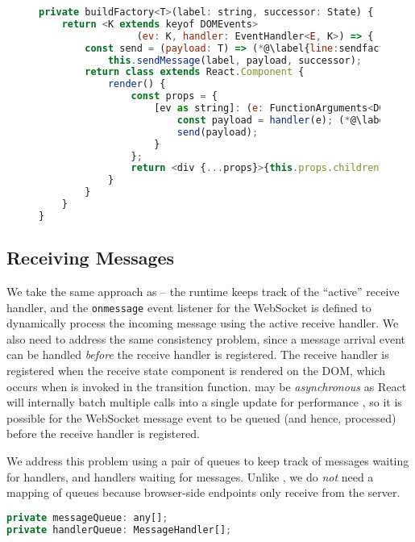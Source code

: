 \begin{figure}[!h]
\begin{lstlisting}[language=javascript,tabsize=2]
private buildFactory<T>(label: string, successor: State) { (*@\label{line:sendfactoryparams}@*)
	return <K extends keyof DOMEvents>
				 (ev: K, handler: EventHandler<E, K>) => {
		const send = (payload: T) => (*@\label{line:sendfactorycurrysend}@*)
			this.sendMessage(label, payload, successor);
		return class extends React.Component {
			render() {
				const props = {
					[ev as string]: (e: FunctionArguments<DOMEvents[K]>) => {
						const payload = handler(e); (*@\label{line:sendfactoryhandler}@*)
						send(payload);
					}
				};
				return <div {...props}>{this.props.children}</div> (*@\label{line:sendfactorydiv}@*)
			}		
		}	
	}
}
\end{lstlisting}
\label{lst:reactsendfactory}
\end{figure}

\subsection{Receiving Messages}
\label{subsection:reactruntimereceive}

We take the same approach as  --
the runtime keeps track of the ``active'' receive handler,
and the \texttt{onmessage} event listener for the WebSocket
is defined to dynamically process the incoming message
using the active receive handler.
We also need to address the same consistency problem, since
a message arrival event can be handled \textit{before}
the receive handler is registered.
The receive handler is registered when the receive state component
is rendered on the DOM, which occurs when 
is invoked in the transition function.
 may be \textit{asynchronous}
as React will internally batch multiple calls into a single update
for performance \cite{ReactState}, so it is possible for the WebSocket message
event to be queued (and hence, processed) before the receive handler
is registered.

We address this problem using a pair of queues to keep track
of messages waiting for handlers, and handlers waiting for messages.
Unlike , we do \textit{not} need a mapping
of queues because browser-side endpoints only receive from the server.

\begin{lstlisting}[language=javascript,numbers=none]
private messageQueue: any[];
private handlerQueue: MessageHandler[];
\end{lstlisting}

